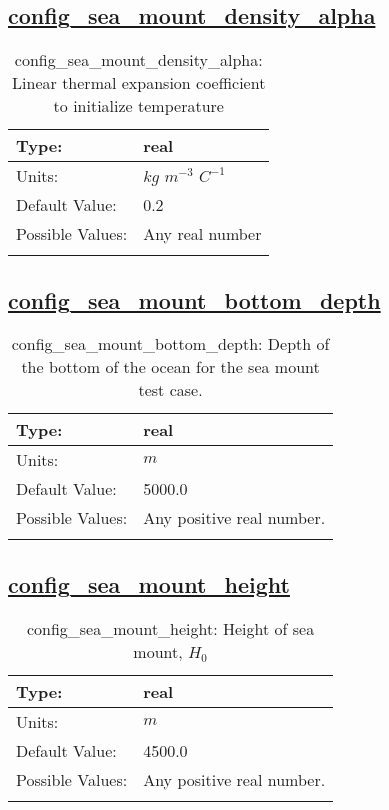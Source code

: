 \subsection[config\_sea\_mount\_density\_alpha]{\hyperref[sec:nm_tab_sea_mount]{config\_sea\_mount\_density\_alpha}}
\label{subsec:nm_sec_config_sea_mount_density_alpha}
\begin{center}
\begin{longtable}{| p{2.0in} || p{4.0in} |}
    \hline
    Type: & real \\
    \hline
    Units: & $kg$ $m^{-3}$ $C^{-1}$ \\
    \hline
    Default Value: & 0.2 \\
    \hline
    Possible Values: & Any real number \\
    \hline
    \caption{config\_sea\_mount\_density\_alpha: Linear thermal expansion coefficient to initialize temperature}
\end{longtable}
\end{center}
\subsection[config\_sea\_mount\_bottom\_depth]{\hyperref[sec:nm_tab_sea_mount]{config\_sea\_mount\_bottom\_depth}}
\label{subsec:nm_sec_config_sea_mount_bottom_depth}
\begin{center}
\begin{longtable}{| p{2.0in} || p{4.0in} |}
    \hline
    Type: & real \\
    \hline
    Units: & $m$ \\
    \hline
    Default Value: & 5000.0 \\
    \hline
    Possible Values: & Any positive real number. \\
    \hline
    \caption{config\_sea\_mount\_bottom\_depth: Depth of the bottom of the ocean for the sea mount test case.}
\end{longtable}
\end{center}
\subsection[config\_sea\_mount\_height]{\hyperref[sec:nm_tab_sea_mount]{config\_sea\_mount\_height}}
\label{subsec:nm_sec_config_sea_mount_height}
\begin{center}
\begin{longtable}{| p{2.0in} || p{4.0in} |}
    \hline
    Type: & real \\
    \hline
    Units: & $m$ \\
    \hline
    Default Value: & 4500.0 \\
    \hline
    Possible Values: & Any positive real number. \\
    \hline
    \caption{config\_sea\_mount\_height:  Height of sea mount,  $H_0$ }
\end{longtable}
\end{center}
